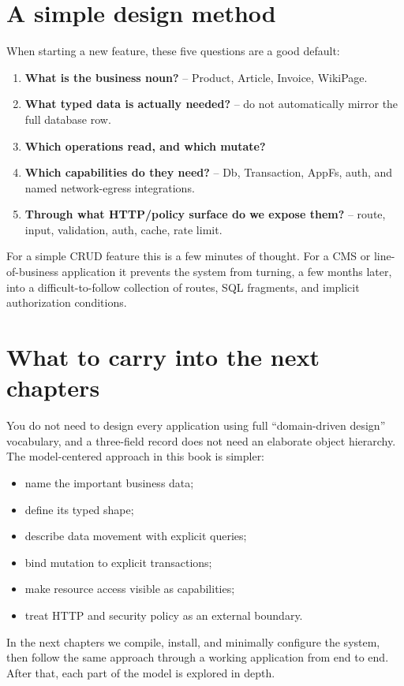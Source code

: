\section{A simple design method}

When starting a new feature, these five questions are a good default:

\begin{enumerate}
  \item \textbf{What is the business noun?} -- Product, Article, Invoice, WikiPage.
  \item \textbf{What typed data is actually needed?} -- do not automatically mirror the full database row.
  \item \textbf{Which operations read, and which mutate?}
  \item \textbf{Which capabilities do they need?} -- Db, Transaction, AppFs, auth, and named network-egress integrations.
  \item \textbf{Through what HTTP/policy surface do we expose them?} -- route, input, validation, auth, cache, rate limit.
\end{enumerate}

For a simple CRUD feature this is a few minutes of thought. For a CMS or line-of-business application it prevents the system from turning, a few months later, into a difficult-to-follow collection of routes, SQL fragments, and implicit authorization conditions.

\section{What to carry into the next chapters}

You do not need to design every application using full ``domain-driven design'' vocabulary, and a three-field record does not need an elaborate object hierarchy. The model-centered approach in this book is simpler:

\begin{itemize}
  \item name the important business data;
  \item define its typed shape;
  \item describe data movement with explicit queries;
  \item bind mutation to explicit transactions;
  \item make resource access visible as capabilities;
  \item treat HTTP and security policy as an external boundary.
\end{itemize}

In the next chapters we compile, install, and minimally configure the system, then follow the same approach through a working  application from end to end. After that, each part of the model is explored in depth.
